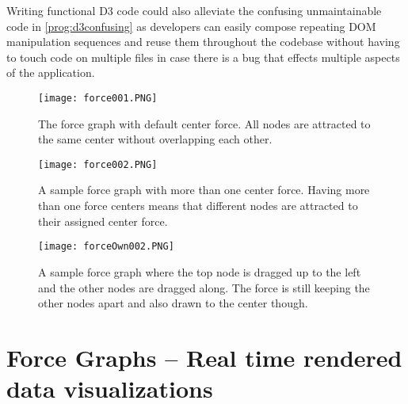 Writing functional D3 code could also alleviate the confusing unmaintainable code in \ref{prog:d3confusing} as developers can easily compose repeating DOM manipulation sequences and reuse them throughout the codebase without having to touch code on multiple files in case there is a bug that effects multiple aspects of the application.



\begin{figure}
  \centering
  \texttt{[image: force001.PNG]}
  \caption{The force graph with default center force. All nodes are attracted to the same center without overlapping each other.}
  \label{fig:force001}
\end{figure}

\begin{figure}
  \centering
  \texttt{[image: force002.PNG]}
  \caption{A sample force graph with more than one center force. Having more than one force centers means that different nodes are attracted to their assigned center force.}
  \label{fig:force002}
\end{figure}

\begin{figure}
  \centering
  \texttt{[image: forceOwn002.PNG]}
  \caption{A sample force graph where the top node is dragged up to the left and the other nodes are dragged along. The force is still keeping the other nodes apart and also drawn to the center though.}
  \label{fig:force003}
\end{figure}

\section{Force Graphs -- Real time rendered data visualizations}


